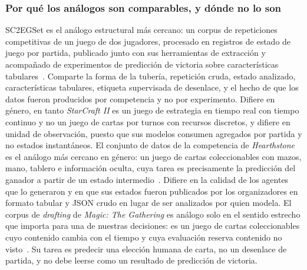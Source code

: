 \documentclass[conference]{IEEEtran}
\begin{document}
\subsubsection{Por qu\'e los an\'alogos son comparables, y d\'onde no lo son}
SC2EGSet es el an\'alogo estructural m\'as cercano: un corpus de
repeticiones competitivas de un juego de dos jugadores, procesado en
registros de estado de juego por partida, publicado junto con sus
herramientas de extracci\'on y acompa\~nado de experimentos de predicci\'on
de victoria sobre caracter\'isticas
tabulares~\cite{bialecki_sc2egset_2023}. Comparte la forma de la tuber\'ia,  repetici\'on cruda, estado analizado, caracter\'isticas tabulares,
etiqueta supervisada de desenlace, y el hecho de que los datos fueron
producidos por competencia y no por experimento. Difiere en g\'enero, en
tanto \emph{StarCraft II} es un juego de estrategia en tiempo real con
tiempo continuo y no un juego de cartas por turnos con recursos discretos,
y difiere en unidad de observaci\'on, puesto que sus modelos consumen
agregados por partida y no estados instant\'aneos. El conjunto de datos de
la competencia de \emph{Hearthstone} es el an\'alogo m\'as cercano en
g\'enero: un juego de cartas coleccionables con mazos, mano, tablero e
informaci\'on oculta, cuya tarea es precisamente la predicci\'on del ganador
a partir de un estado intermedio~\cite{janusz_hearthstone_2017}. Difiere en
la calidad de los agentes que lo generaron y en que sus estados fueron
publicados por los organizadores en formato tabular y JSON crudo en lugar de
ser analizados por quien modela. El corpus de \emph{drafting} de
\emph{Magic: The Gathering} es an\'alogo solo en el sentido estrecho que
importa para una de nuestras decisiones: es un juego de cartas
coleccionables cuyo contenido cambia con el tiempo y cuya evaluaci\'on
reserva contenido no visto~\cite{bertram_cardrepresentations_2024}. Su tarea
es predecir una elecci\'on humana de carta, no un desenlace de partida, y no
debe leerse como un resultado de predicci\'on de victoria.
\end{document}
